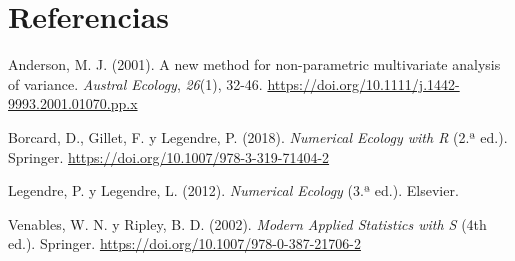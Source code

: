 \documentclass[
  12pt,
  man,
  floatsintext]{apa7}
\newlength{\cslhangindent}
\newenvironment{CSLReferences}[2] %
 {\begin{list}{}{%
  \setlength{\itemindent}{0pt}
  \setlength{\leftmargin}{0pt}
  \setlength{\parsep}{0pt}
  \ifodd #1
   \setlength{\leftmargin}{\cslhangindent}
   \setlength{\itemindent}{-1\cslhangindent}
  \fi
  \setlength{\itemsep}{#2\baselineskip}}}
 {\end{list}}
\begin{document}
\section*{Referencias}\label{referencias}

\label{refs}
\begin{CSLReferences}{1}{0}
Anderson, M. J. (2001). A new method for non-parametric multivariate analysis of variance. \emph{Austral Ecology}, \emph{26}(1), 32-46. \url{https://doi.org/10.1111/j.1442-9993.2001.01070.pp.x}

Borcard, D., Gillet, F. y Legendre, P. (2018). \emph{Numerical Ecology with R} (2.ª ed.). Springer. \url{https://doi.org/10.1007/978-3-319-71404-2}

Legendre, P. y Legendre, L. (2012). \emph{Numerical Ecology} (3.ª ed.). Elsevier.

Venables, W. N. y Ripley, B. D. (2002). \emph{Modern Applied Statistics with S} (4th ed.). Springer. \url{https://doi.org/10.1007/978-0-387-21706-2}

\end{CSLReferences}
\end{document}
